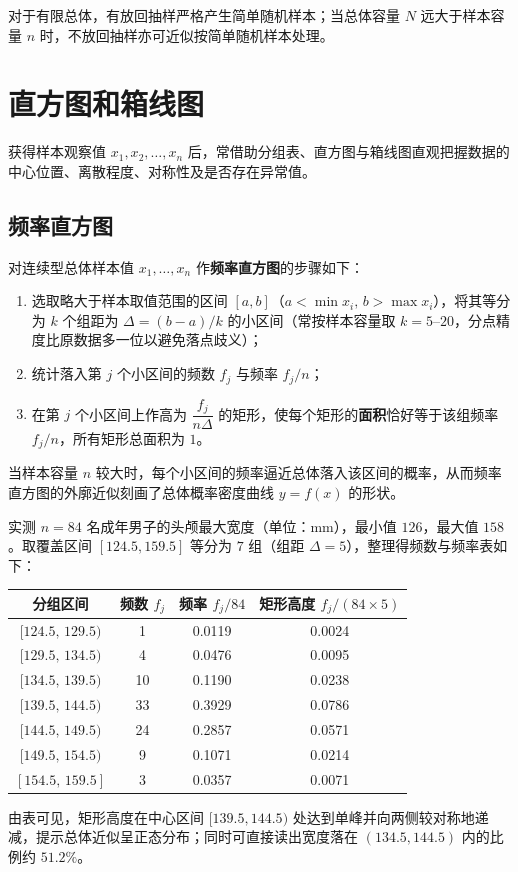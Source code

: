 对于有限总体，有放回抽样严格产生简单随机样本；当总体容量 $N$ 远大于样本容量 $n$ 时，不放回抽样亦可近似按简单随机样本处理。

\section{直方图和箱线图}
\label{sec:histogram-boxplot}

获得样本观察值 $x_1,x_2,\ldots,x_n$ 后，常借助分组表、直方图与箱线图直观把握数据的中心位置、离散程度、对称性及是否存在异常值。

\subsection{频率直方图}

对连续型总体样本值 $x_1,\ldots,x_n$ 作\textbf{频率直方图}的步骤如下：
\begin{enumerate}
  \item 选取略大于样本取值范围的区间 $[a,b]$（$a<\min x_i,\,b>\max x_i$），将其等分为 $k$ 个组距为 $\Delta=(b-a)/k$ 的小区间（常按样本容量取 $k=5\text{--}20$，分点精度比原数据多一位以避免落点歧义）；
  \item 统计落入第 $j$ 个小区间的频数 $f_j$ 与频率 $f_j/n$；
  \item 在第 $j$ 个小区间上作高为 $\dfrac{f_j}{n\Delta}$ 的矩形，使每个矩形的\textbf{面积}恰好等于该组频率 $f_j/n$，所有矩形总面积为 $1$。
\end{enumerate}

当样本容量 $n$ 较大时，每个小区间的频率逼近总体落入该区间的概率，从而频率直方图的外廓近似刻画了总体概率密度曲线 $y=f(x)$ 的形状。

\begin{example}[title={头颅最大宽度数据的分组频数表}]
\label{eg:etruscan-histogram}
实测 $n=84$ 名成年男子的头颅最大宽度（单位：$\mathrm{mm}$），最小值 $126$，最大值 $158$。取覆盖区间 $[124.5,159.5]$ 等分为 $7$ 组（组距 $\Delta=5$），整理得频数与频率表如下：
\begin{center}
\begin{tabular}{cccc}
  \toprule
  分组区间 & 频数 $f_j$ & 频率 $f_j/84$ & 矩形高度 $f_j/(84\times 5)$ \\
  \midrule
  $[124.5,\,129.5)$ & 1  & 0.0119 & 0.0024 \\
  $[129.5,\,134.5)$ & 4  & 0.0476 & 0.0095 \\
  $[134.5,\,139.5)$ & 10 & 0.1190 & 0.0238 \\
  $[139.5,\,144.5)$ & 33 & 0.3929 & 0.0786 \\
  $[144.5,\,149.5)$ & 24 & 0.2857 & 0.0571 \\
  $[149.5,\,154.5)$ & 9  & 0.1071 & 0.0214 \\
  $[154.5,\,159.5]$ & 3  & 0.0357 & 0.0071 \\
  \bottomrule
\end{tabular}
\end{center}
由表可见，矩形高度在中心区间 $[139.5,144.5)$ 处达到单峰并向两侧较对称地递减，提示总体近似呈正态分布；同时可直接读出宽度落在 $(134.5,144.5)$ 内的比例约 $51.2\%$。
\end{example}

